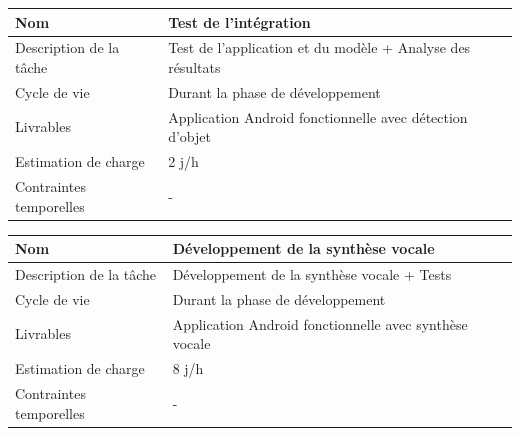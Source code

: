 \documentclass[CDS,UTF8,final]{EPURapport}
\begin{document}
\newpage

\begin{table}[h!]
\centering
\begin{tabular}{|p{4cm}|p{10cm}|}
\hline
Nom                     & Test de l'intégration                                      \\ \hline
Description de la tâche & Test de l'application et du modèle + Analyse des résultats \\ \hline
Cycle de vie            & Durant la phase de développement                           \\ \hline
Livrables               & Application Android fonctionnelle avec détection d'objet   \\ \hline
Estimation de charge    & 2 j/h                                                      \\ \hline
Contraintes temporelles & -                                                          \\ \hline
\end{tabular}
\end{table}
\par

\begin{table}[h!]
\centering
\begin{tabular}{|p{4cm}|p{10cm}|}
\hline
Nom                     & Développement de la synthèse vocale                    \\ \hline
Description de la tâche & Développement de la synthèse vocale + Tests            \\ \hline
Cycle de vie            & Durant la phase de développement                       \\ \hline
Livrables               & Application Android fonctionnelle avec synthèse vocale \\ \hline
Estimation de charge    & 8 j/h                                                  \\ \hline
Contraintes temporelles & -                                                      \\ \hline
\end{tabular}
\end{table}
\par
\end{document}

